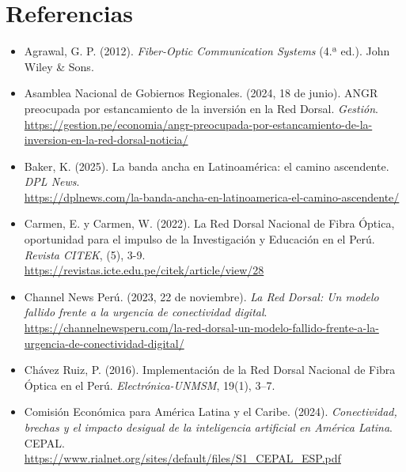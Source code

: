 \section*{Referencias}

\begin{itemize}[leftmargin=1.27cm, itemindent=-1.27cm, label={}, itemsep=12pt, parsep=0pt]
\raggedright

\item Agrawal, G. P. (2012). \textit{Fiber-Optic Communication Systems} (4.ª ed.). John Wiley \& Sons.\\

\item Asamblea Nacional de Gobiernos Regionales. (2024, 18 de junio). ANGR preocupada por estancamiento de la inversión en la Red Dorsal. \textit{Gestión}.\\
\url{https://gestion.pe/economia/angr-preocupada-por-estancamiento-de-la-inversion-en-la-red-dorsal-noticia/}

\item Baker, K. (2025). La banda ancha en Latinoamérica: el camino ascendente. \textit{DPL News}.\\
\url{https://dplnews.com/la-banda-ancha-en-latinoamerica-el-camino-ascendente/}

\item Carmen, E. y Carmen, W. (2022). La Red Dorsal Nacional de Fibra Óptica, oportunidad para el impulso de la Investigación y Educación en el Perú. \textit{Revista CITEK}, (5), 3-9.\\
\url{https://revistas.icte.edu.pe/citek/article/view/28}

\item Channel News Perú. (2023, 22 de noviembre). \textit{La Red Dorsal: Un modelo fallido frente a la urgencia de conectividad digital}.\\
\url{https://channelnewsperu.com/la-red-dorsal-un-modelo-fallido-frente-a-la-urgencia-de-conectividad-digital/}

\item Chávez Ruiz, P. (2016). Implementación de la Red Dorsal Nacional de Fibra Óptica en el Perú. \textit{Electrónica-UNMSM}, 19(1), 3–7. \\

\item Comisión Económica para América Latina y el Caribe. (2024). \textit{Conectividad, brechas y el impacto desigual de la inteligencia artificial en América Latina}. CEPAL.\\
\url{https://www.rialnet.org/sites/default/files/S1_CEPAL_ESP.pdf}


\end{itemize}
